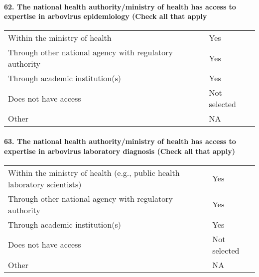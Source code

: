 \documentclass[
]{article}
\begin{document}
\hypertarget{the-national-health-authorityministry-of-health-has-access-to-expertise-in-arbovirus-epidemiology-check-all-that-apply}{%
\paragraph{62. The national health authority/ministry of health has
access to expertise in arbovirus epidemiology (Check all that
apply}\label{the-national-health-authorityministry-of-health-has-access-to-expertise-in-arbovirus-epidemiology-check-all-that-apply}}

\begin{longtable}[]{@{}ll@{}}
\toprule
\endhead
Within the ministry of health & Yes \\
Through other national agency with regulatory authority & Yes \\
Through academic institution(s) & Yes \\
Does not have access & Not selected \\
Other & NA \\
\bottomrule
\end{longtable}

\hypertarget{the-national-health-authorityministry-of-health-has-access-to-expertise-in-arbovirus-laboratory-diagnosis-check-all-that-apply}{%
\paragraph{63. The national health authority/ministry of health has
access to expertise in arbovirus laboratory diagnosis (Check all that
apply)}\label{the-national-health-authorityministry-of-health-has-access-to-expertise-in-arbovirus-laboratory-diagnosis-check-all-that-apply}}

\begin{longtable}[]{@{}
  >{\raggedright\arraybackslash}p{}
  >{\raggedright\arraybackslash}p{}@{}}
\toprule
\endhead
Within the ministry of health (e.g., public health laboratory
scientists) & Yes \\
Through other national agency with regulatory authority & Yes \\
Through academic institution(s) & Yes \\
Does not have access & Not selected \\
Other & NA \\
\bottomrule
\end{longtable}
\end{document}
